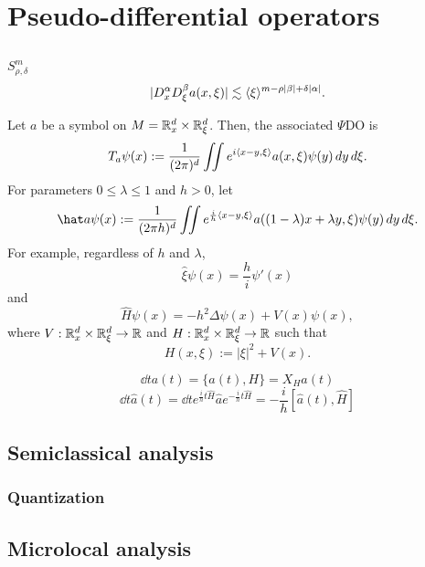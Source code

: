 \documentclass{../note}
\begin{document}
\part{Pseudo-differential operators}
\chapter{}
\section{}
$S_{\rho,\delta}^m$
\[|D_x^\alpha D_\xi^\beta a(x,\xi)|\lesssim\langle\xi\rangle^{m-\rho|\beta|+\delta|\alpha|}.\]

Let $a$ be a symbol on $M=\mathbb{R}_x^d\times\mathbb{R}_\xi^d$.
Then, the associated $\Psi$DO is
\[T_a\psi(x):=\frac1{(2\pi)^d}\iint e^{i\langle x-y,\xi\rangle}a(x,\xi)\psi(y)\,dy\,d\xi.\]
For parameters $0\le\lambda\le1$ and $h>0$, let
\[\hat a\psi(x):=\frac1{(2\pi h)^d}\iint e^{\frac ih\<x-y,\xi\>}a((1-\lambda)x+\lambda y,\xi)\psi(y)\,dy\,d\xi.\]
For example, regardless of $h$ and $\lambda$,
\[\hat\xi\psi(x)=\frac hi\psi'(x)\]
and
\[\hat H\psi(x)=-h^2\Delta\psi(x)+V(x)\psi(x),\]
where $V:\mathbb{R}_x^d\times\mathbb{R}_\xi^d\to\mathbb{R}$ and $H:\mathbb{R}_x^d\times\mathbb{R}_\xi^d\to\mathbb{R}$ such that
\[H(x,\xi):=|\xi|^2+V(x).\]


\[\dd{t}a(t)=\{a(t),H\}=X_Ha(t)\]
\[\dd{t}\hat a(t)=\dd{t}e^{\frac iht\hat H}\hat ae^{-\frac iht\hat H}=-\frac ih[\hat a(t),\hat H]\]


\chapter{Semiclassical analysis}
\section{Quantization}
\begin{prb}

\end{prb}


\chapter{Microlocal analysis}
\end{document}
